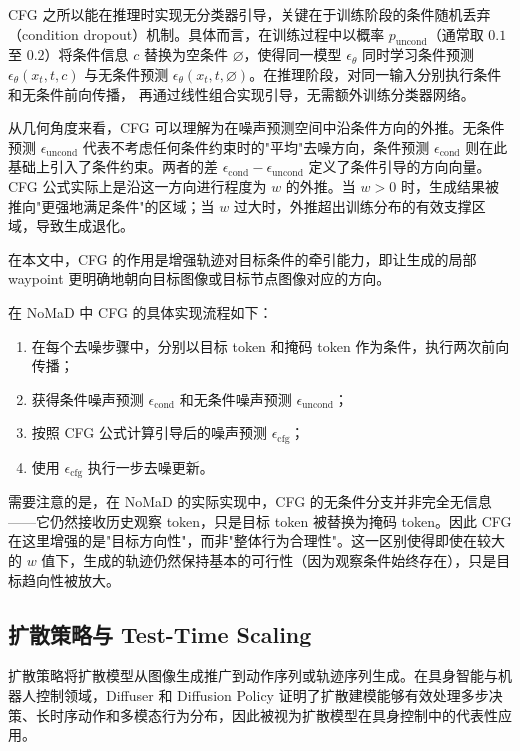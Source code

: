 CFG 之所以能在推理时实现无分类器引导，关键在于训练阶段的条件随机丢弃（condition dropout）机制。具体而言，在训练过程中以概率 $p_{\text{uncond}}$（通常取 $0.1$ 至 $0.2$）将条件信息 $c$ 替换为空条件 $\varnothing$，使得同一模型 $\epsilon_\theta$ 同时学习条件预测 $\epsilon_\theta(x_t, t, c)$ 与无条件预测 $\epsilon_\theta(x_t, t, \varnothing)$。在推理阶段，对同一输入分别执行条件和无条件前向传播，
再通过线性组合实现引导，无需额外训练分类器网络。

从几何角度来看，CFG 可以理解为在噪声预测空间中沿条件方向的外推。无条件预测 $\epsilon_{\text{uncond}}$ 代表不考虑任何条件约束时的"平均"去噪方向，条件预测 $\epsilon_{\text{cond}}$ 则在此基础上引入了条件约束。两者的差 $\epsilon_{\text{cond}} - \epsilon_{\text{uncond}}$ 定义了条件引导的方向向量。CFG 公式实际上是沿这一方向进行程度为 $w$ 的外推。当 $w > 0$ 时，生成结果被推向"更强地满足条件"的区域；当 $w$ 过大时，外推超出训练分布的有效支撑区域，导致生成退化。

在本文中，CFG 的作用是增强轨迹对目标条件的牵引能力，即让生成的局部 waypoint 更明确地朝向目标图像或目标节点图像对应的方向。

在 NoMaD 中 CFG 的具体实现流程如下：
\begin{enumerate}
    \item 在每个去噪步骤中，分别以目标 token 和掩码 token 作为条件，执行两次前向传播；
    \item 获得条件噪声预测 $\epsilon_{\text{cond}}$ 和无条件噪声预测 $\epsilon_{\text{uncond}}$；
    \item 按照 CFG 公式计算引导后的噪声预测 $\epsilon_{\text{cfg}}$；
    \item 使用 $\epsilon_{\text{cfg}}$ 执行一步去噪更新。
\end{enumerate}
需要注意的是，在 NoMaD 的实际实现中，CFG 的无条件分支并非完全无信息——它仍然接收历史观察 token，只是目标 token 被替换为掩码 token。因此 CFG 在这里增强的是"目标方向性"，而非"整体行为合理性"。这一区别使得即使在较大的 $w$ 值下，生成的轨迹仍然保持基本的可行性（因为观察条件始终存在），只是目标趋向性被放大。

\subsection{扩散策略与 Test-Time Scaling}

扩散策略将扩散模型从图像生成推广到动作序列或轨迹序列生成\cite{diffuser2022,diffusionpolicy2023}。在具身智能与机器人控制领域，Diffuser 和 Diffusion Policy 证明了扩散建模能够有效处理多步决策、长时序动作和多模态行为分布，因此被视为扩散模型在具身控制中的代表性应用。

